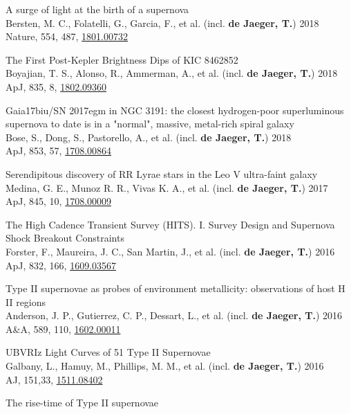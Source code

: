 \documentclass[12pt]{article}
\begin{document}
\begin{bibenum}
A surge of light at the birth of a supernova\\
Bersten, M. C., Folatelli, G., Garcia, F., et al. (incl. \textbf{de Jaeger, T.}) 2018\\
Nature, 554, 487, \href{https://arxiv.org/abs/1801.00732}{1801.00732}
    \item 	
The First Post-Kepler Brightness Dips of KIC 8462852\\
Boyajian, T. S., Alonso, R., Ammerman, A., et al. (incl. \textbf{de Jaeger, T.}) 2018\\
ApJ, 835, 8, \href{https://arxiv.org/abs/1802.09360}{1802.09360}
    \item 	
Gaia17biu/SN 2017egm in NGC 3191: the closest hydrogen-poor superluminous supernova to date is in a "normal", massive, metal-rich spiral galaxy\\
Bose, S., Dong, S., Pastorello, A., et al. (incl. \textbf{de Jaeger, T.}) 2018\\
ApJ, 853, 57, \href{https://arxiv.org/abs/1708.00864}{1708.00864}
    \item 
Serendipitous discovery of RR Lyrae stars in the Leo V ultra-faint galaxy\\
Medina, G. E., Munoz R. R., Vivas K. A., et al. (incl. \textbf{de Jaeger, T.}) 2017\\
ApJ, 845, 10, \href{https://arxiv.org/abs/1708.00009}{1708.00009}
    \item 
The High Cadence Transient Survey (HITS). I. Survey Design and Supernova Shock Breakout Constraints\\
Forster, F., Maureira, J. C., San Martin, J., et al. (incl. \textbf{de Jaeger, T.}) 2016\\
ApJ, 832, 166, \href{https://arxiv.org/abs/1609.03567}{1609.03567}
    \item 
Type II supernovae as probes of environment metallicity: observations of host H II regions\\
Anderson, J. P., Gutierrez, C. P., Dessart, L., et al. (incl. \textbf{de Jaeger, T.}) 2016\\
A\&A, 589, 110, \href{https://arxiv.org/abs/1602.00011}{1602.00011}
    \item 
UBVRIz Light Curves of 51 Type II Supernovae\\
Galbany, L., Hamuy, M., Phillips, M. M., et al. (incl. \textbf{de Jaeger, T.}) 2016\\
AJ, 151,33, \href{http://arxiv.org/abs/1511.08402}{1511.08402}
    \item 
The rise-time of Type II supernovae\\

\end{bibenum}
\end{document}
